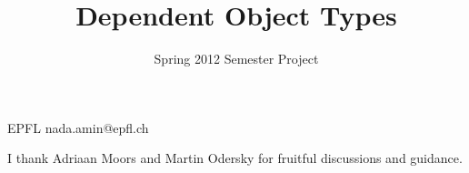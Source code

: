 \documentclass[preprint]{sigplanconf}
\begin{document}
\copyrightdata{[to be supplied]} 


\title{Dependent Object Types}
\subtitle{Spring 2012 Semester Project}

           {EPFL}
           {nada.amin@epfl.ch}

\maketitle

\begin{abstract}
\end{abstract}


\acks

I thank Adriaan Moors and Martin Odersky for fruitful discussions and
guidance.

%
%
\end{document}
